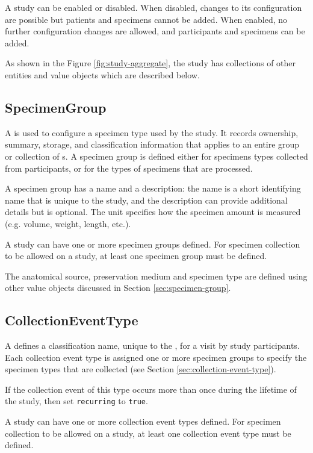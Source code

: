 A study can be enabled or disabled. When disabled, changes to its configuration
are possible but patients and specimens cannot be added. When enabled, no
further configuration changes are allowed, and participants and specimens can
be added.

As shown in the Figure \ref{fig:study-aggregate}, the study has collections of
other entities and value objects which are described below.

\subsection*{SpecimenGroup}

A  is used to configure a specimen type used by the
study.  It records ownership, summary, storage, and classification information
that applies to an entire group or collection of s. A
specimen group is defined either for specimens types collected from
participants, or for the types of specimens that are processed.

A specimen group has a name and a description: the name is a short identifying
name that is unique to the study, and the description can provide additional
details but is optional. The unit specifies how the specimen amount is measured
(e.g. volume, weight, length, etc.).

A study can have one or more specimen groups defined.  For specimen collection
to be allowed on a study, at least one specimen group must be defined.

The anatomical source, preservation medium and specimen type are defined using
other value objects discussed in Section \ref{sec:specimen-group}.

\subsection*{CollectionEventType}

A  defines a classification name, unique to
the , for a visit by study participants. Each collection
event type is assigned one or more specimen groups to specify the specimen
types that are collected (see Section \ref{sec:collection-event-type}).

If the collection event of this type occurs more than once during the lifetime
of the study, then set \texttt{recurring} to \texttt{true}.

A study can have one or more collection event types defined. For specimen
collection to be allowed on a study, at least one collection event type must be
defined.

